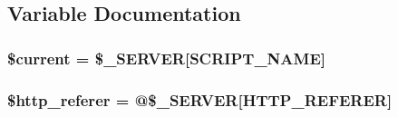 \subsection{Variable Documentation}
\subsubsection[{\texorpdfstring{\$current}{$current}}]{\setlength{\rightskip}{0pt plus 5cm}\$current = \$\+\_\+\+S\+E\+R\+V\+ER\mbox{[}\textquotesingle{}S\+C\+R\+I\+P\+T\+\_\+\+N\+A\+ME\textquotesingle{}\mbox{]}}\hypertarget{core_8php_a2c4c58e377f6c66ca38c8ea97666fc5e}{}\label{core_8php_a2c4c58e377f6c66ca38c8ea97666fc5e}
\subsubsection[{\texorpdfstring{\$http\+\_\+referer}{$http_referer}}]{\setlength{\rightskip}{0pt plus 5cm}\$http\+\_\+referer = @\$\+\_\+\+S\+E\+R\+V\+ER\mbox{[}\textquotesingle{}H\+T\+T\+P\+\_\+\+R\+E\+F\+E\+R\+ER\textquotesingle{}\mbox{]}}\hypertarget{core_8php_af25ba4c2b4305994db82780de5cf37e3}{}\label{core_8php_af25ba4c2b4305994db82780de5cf37e3}

